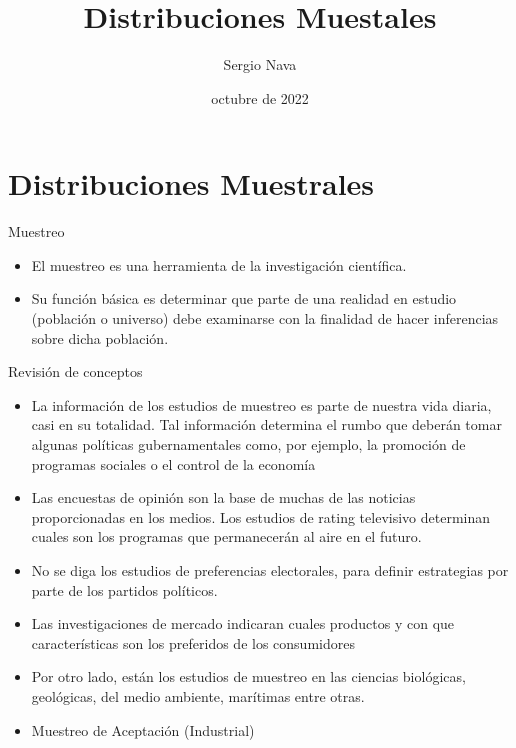 \documentclass[
  10pt,
  ignorenonframetext,
]{beamer}
\title{Distribuciones Muestales}
\author{Sergio Nava}
\date{octubre de 2022}
\providecommand{\tightlist}{%
  \setlength{\itemsep}{0pt}\setlength{\parskip}{0pt}}
\begin{document}
\frame{\titlepage}

\begin{frame}[allowframebreaks]
  \tableofcontents[hideallsubsections]
\end{frame}
\hypertarget{distribuciones-muestrales}{%
\section{Distribuciones Muestrales}\label{distribuciones-muestrales}}

\begin{frame}{Muestreo}
\protect\hypertarget{muestreo}{}
\begin{itemize}
\tightlist
\item
  El muestreo es una herramienta de la investigación científica.
\item
  Su función básica es determinar que parte de una realidad en estudio
  (población o universo) debe examinarse con la finalidad de hacer
  inferencias sobre dicha población.
\end{itemize}
\end{frame}

\begin{frame}{Revisión de conceptos}
\protect\hypertarget{revisiuxf3n-de-conceptos}{}
\begin{itemize}
\item
  La información de los estudios de muestreo es parte de nuestra vida
  diaria, casi en su totalidad. Tal información determina el rumbo que
  deberán tomar algunas políticas gubernamentales como, por ejemplo, la
  promoción de programas sociales o el control de la economía
\item
  Las encuestas de opinión son la base de muchas de las noticias
  proporcionadas en los medios. Los estudios de rating televisivo
  determinan cuales son los programas que permanecerán al aire en el
  futuro.
\item
  No se diga los estudios de preferencias electorales, para definir
  estrategias por parte de los partidos políticos.
\item
  Las investigaciones de mercado indicaran cuales productos y con que
  características son los preferidos de los consumidores
\item
  Por otro lado, están los estudios de muestreo en las ciencias
  biológicas, geológicas, del medio ambiente, marítimas entre otras.
\item
  Muestreo de Aceptación (Industrial)
\end{itemize}
\end{frame}
\end{document}
